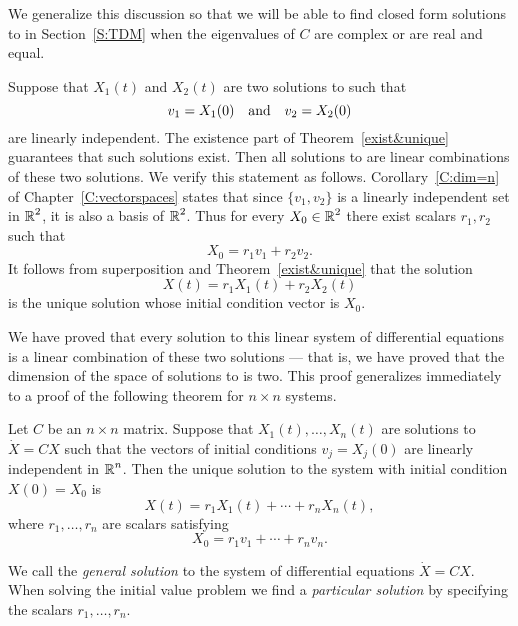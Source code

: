 \documentclass{ximera}
\begin{document}
We generalize this discussion so that we will be able to find closed form 
solutions to  in Section~\ref{S:TDM} when the eigenvalues 
of $C$ are complex or are real and equal.

Suppose that $X_1(t)$ and $X_2(t)$ are two solutions to  such
that
\[
v_1=X_1(0) \quad\mbox{and}\quad v_2=X_2(0)
\]
are linearly independent.  The existence part of
Theorem~\ref{exist&unique}
guarantees that such solutions exist.  Then all solutions to 
are linear combinations of these two solutions.  We verify this statement as
follows.  Corollary~\ref{C:dim=n} of Chapter~\ref{C:vectorspaces} states
that since $\{v_1,v_2\}$ is a linearly independent set in $\mbox{$\Bbb{R}$}^2$, it is
also a basis of $\mbox{$\Bbb{R}$}^2$.  Thus for every $X_0\in\mbox{$\Bbb{R}$}^2$ there exist scalars
$r_1,r_2$ such that
\[
X_0 = r_1v_1 + r_2v_2.
\]
It follows from superposition and Theorem~\ref{exist&unique} that the
solution
\[
X(t) = r_1X_1(t) + r_2X_2(t)
\]
is the unique solution whose initial condition vector is $X_0$.

We have proved that every solution to this linear system of differential
equations is a linear combination of these two solutions --- that is, we
have proved that the dimension of the space of solutions to 
is two.  This proof generalizes immediately to a proof of the following
theorem for $n\times n$ systems.

\begin{thm}  \label{T:solvends}
Let $C$ be an $n\times n$ matrix.  Suppose that $X_1(t),\ldots,X_n(t)$
are  solutions to $\dot{X}=CX$ such that the vectors of initial conditions
$v_j=X_j(0)$ are linearly independent in $\mbox{$\Bbb{R}$}^n$.  Then the unique solution
to the system  with initial condition $X(0)=X_0$ is
\begin{equation}  \label{E:genlsoln}
X(t)=r_1X_1(t) + \cdots + r_nX_n(t),
\end{equation}
where $r_1,\ldots,r_n$ are scalars satisfying
\begin{equation} \label{findscalars}
X_0 = r_1v_1 + \cdots + r_nv_n.
\end{equation}
\end{thm}

We call  the {\em general solution\/} 
to the system of differential equations $\dot{X}=CX$.  When solving the
initial value problem we find a {\em particular solution\/}
by specifying the scalars $r_1,\ldots,r_n$.
\end{document}
